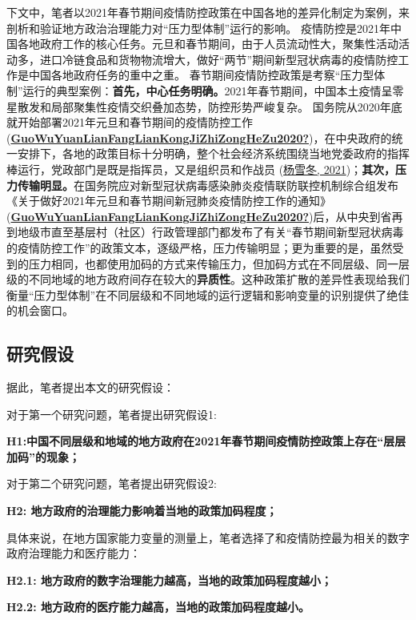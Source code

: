 \documentclass[
  12pt,
]{ctexart}
\begin{document}
下文中，笔者以2021年春节期间疫情防控政策在中国各地的差异化制定为案例，来剖析和验证地方政治治理能力对``压力型体制''运行的影响。
疫情防控是2021年中国各地政府工作的核心任务。元旦和春节期间，由于人员流动性大，聚集性活动活动多，进口冷链食品和货物物流增大，做好``两节''期间新型冠状病毒的疫情防控工作是中国各地政府任务的重中之重。
春节期间疫情防控政策是考察``压力型体制''运行的典型案例：\textbf{首先，中心任务明确。}2021年春节期间，中国本土疫情呈零星散发和局部聚集性疫情交织叠加态势，防控形势严峻复杂。
国务院从2020年底就开始部署2021年元旦和春节期间的疫情防控工作(\protect\hyperlink{ref-GuoWuYuanLianFangLianKongJiZhiZongHeZu2020}{\textbf{GuoWuYuanLianFangLianKongJiZhiZongHeZu2020?}})，在中央政府的统一安排下，各地的政策目标十分明确，整个社会经济系统围绕当地党委政府的指挥棒运行，党政部门是既是指挥员，又是组织员和作战员 (\protect\hyperlink{ref-YangXueDong2021}{杨雪冬, 2021})；\textbf{其次，压力传输明显。}在国务院应对新型冠状病毒感染肺炎疫情联防联控机制综合组发布《关于做好2021年元旦和春节期间新冠肺炎疫情防控工作的通知》(\protect\hyperlink{ref-GuoWuYuanLianFangLianKongJiZhiZongHeZu2020}{\textbf{GuoWuYuanLianFangLianKongJiZhiZongHeZu2020?}})后，从中央到省再到地级市直至基层村（社区）行政管理部门都发布了有关``春节期间新型冠状病毒的疫情防控工作''的政策文本，逐级严格，压力传输明显；更为重要的是，虽然受到的压力相同，也都使用加码的方式来传输压力，但加码方式在不同层级、同一层级的不同地域的地方政府间存在较大的\textbf{异质性}。这种政策扩散的差异性表现给我们衡量``压力型体制''在不同层级和不同地域的运行逻辑和影响变量的识别提供了绝佳的机会窗口。

\hypertarget{ux7814ux7a76ux5047ux8bbe}{%
\subsection{研究假设}\label{ux7814ux7a76ux5047ux8bbe}}

据此，笔者提出本文的研究假设：

对于第一个研究问题，笔者提出研究假设1:

\textbf{H1:中国不同层级和地域的地方政府在2021年春节期间疫情防控政策上存在``层层加码''的现象；}

对于第二个研究问题，笔者提出研究假设2:

\textbf{H2: 地方政府的治理能力影响着当地的政策加码程度；}

具体来说，在地方国家能力变量的测量上，笔者选择了和疫情防控最为相关的数字政府治理能力和医疗能力：

\textbf{H2.1: 地方政府的数字治理能力越高，当地的政策加码程度越小；}

\textbf{H2.2: 地方政府的医疗能力越高，当地的政策加码程度越小。}
\end{document}
